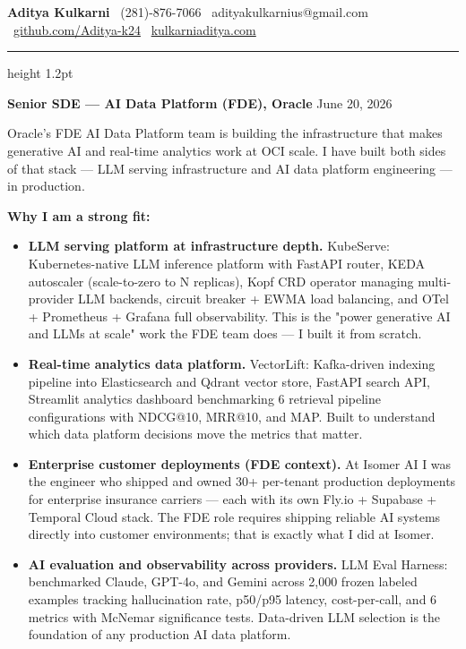 \documentclass[11pt,letterpaper]{article}
\begin{document}
\thispagestyle{empty}

{\large \textbf{Aditya Kulkarni}} \hfill
{\color{OracleRed} \faPhone\ (281)-876-7066} \quad
{\color{OracleRed} \faEnvelope\ adityakulkarnius@gmail.com} \\
{\color{OracleRed} \faGithub\ \href{https://github.com/Aditya-k24}{github.com/Aditya-k24}} \quad
{\color{OracleRed} \faGlobe\ \href{https://www.kulkarniaditya.com}{kulkarniaditya.com}}

\vspace{6pt}
{\color{OracleRed}\hrule height 1.2pt}
\vspace{12pt}

{\color{OracleRed} \textbf{Senior SDE --- AI Data Platform (FDE), Oracle}} \hfill June 20, 2026

\vspace{10pt}

Oracle's FDE AI Data Platform team is building the infrastructure that makes generative AI and real-time analytics work at OCI scale. I have built both sides of that stack --- LLM serving infrastructure and AI data platform engineering --- in production.

\vspace{6pt}

\textbf{Why I am a strong fit:}

\begin{itemize}
  \item[\faAngleRight] \textbf{LLM serving platform at infrastructure depth.} KubeServe: Kubernetes-native LLM inference platform with FastAPI router, KEDA autoscaler (scale-to-zero to N replicas), Kopf CRD operator managing multi-provider LLM backends, circuit breaker + EWMA load balancing, and OTel + Prometheus + Grafana full observability. This is the "power generative AI and LLMs at scale" work the FDE team does --- I built it from scratch.

  \item[\faAngleRight] \textbf{Real-time analytics data platform.} VectorLift: Kafka-driven indexing pipeline into Elasticsearch and Qdrant vector store, FastAPI search API, Streamlit analytics dashboard benchmarking 6 retrieval pipeline configurations with NDCG@10, MRR@10, and MAP. Built to understand which data platform decisions move the metrics that matter.

  \item[\faAngleRight] \textbf{Enterprise customer deployments (FDE context).} At Isomer AI I was the engineer who shipped and owned 30+ per-tenant production deployments for enterprise insurance carriers --- each with its own Fly.io + Supabase + Temporal Cloud stack. The FDE role requires shipping reliable AI systems directly into customer environments; that is exactly what I did at Isomer.

  \item[\faAngleRight] \textbf{AI evaluation and observability across providers.} LLM Eval Harness: benchmarked Claude, GPT-4o, and Gemini across 2,000 frozen labeled examples tracking hallucination rate, p50/p95 latency, cost-per-call, and 6 metrics with McNemar significance tests. Data-driven LLM selection is the foundation of any production AI data platform.
\end{itemize}
\end{document}
